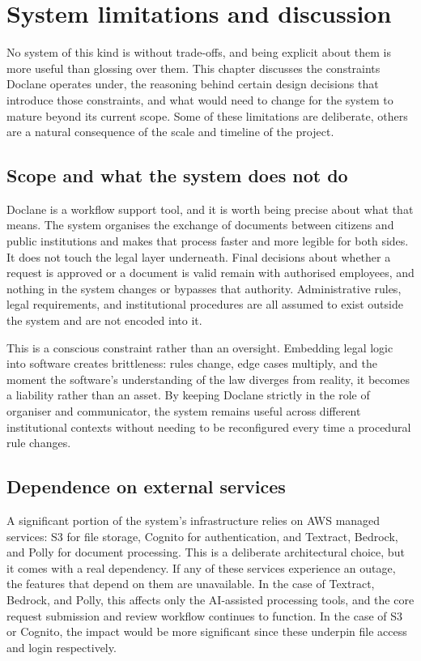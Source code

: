 \chapter{System limitations and discussion}
\label{chap:limitations}

\par No system of this kind is without trade-offs, and being explicit about them is more useful than glossing over them. This chapter discusses the constraints Doclane operates under, the reasoning behind certain design decisions that introduce those constraints, and what would need to change for the system to mature beyond its current scope. Some of these limitations are deliberate, others are a natural consequence of the scale and timeline of the project.

\section{Scope and what the system does not do}

\par Doclane is a workflow support tool, and it is worth being precise about what that means. The system organises the exchange of documents between citizens and public institutions and makes that process faster and more legible for both sides. It does not touch the legal layer underneath. Final decisions about whether a request is approved or a document is valid remain with authorised employees, and nothing in the system changes or bypasses that authority. Administrative rules, legal requirements, and institutional procedures are all assumed to exist outside the system and are not encoded into it.

\par This is a conscious constraint rather than an oversight. Embedding legal logic into software creates brittleness: rules change, edge cases multiply, and the moment the software's understanding of the law diverges from reality, it becomes a liability rather than an asset. By keeping Doclane strictly in the role of organiser and communicator, the system remains useful across different institutional contexts without needing to be reconfigured every time a procedural rule changes.

\section{Dependence on external services}

\par A significant portion of the system's infrastructure relies on AWS managed services: S3 for file storage, Cognito for authentication, and Textract, Bedrock, and Polly for document processing. This is a deliberate architectural choice, but it comes with a real dependency. If any of these services experience an outage, the features that depend on them are unavailable. In the case of Textract, Bedrock, and Polly, this affects only the AI-assisted processing tools, and the core request submission and review workflow continues to function. In the case of S3 or Cognito, the impact would be more significant since these underpin file access and login respectively.

